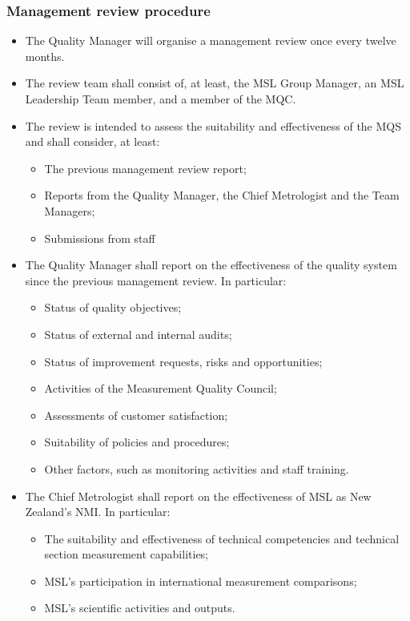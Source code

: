 \subsubsection{Management review procedure}
\begin{itemize}
\item The Quality Manager will organise a management review once every twelve months. 
\item The review team shall consist of, at least, the MSL Group Manager, an MSL Leadership Team member, and a member of the MQC.
\item The review is intended to assess the suitability and effectiveness of the MQS and shall consider, at least:
\begin{itemize}
\item The previous management review report;
\item Reports from the Quality Manager, the Chief Metrologist and the Team Managers; 
\item Submissions from staff
\end{itemize}
\item The Quality Manager shall report on the effectiveness of the quality system since the previous management review. In particular:
\begin{itemize}
\item Status of quality objectives;
\item Status of external and internal audits;
\item Status of improvement requests, risks and opportunities;
\item Activities of the Measurement Quality Council;
\item Assessments of customer satisfaction;
\item Suitability of policies and procedures;
\item Other factors, such as monitoring activities and staff training.
\end{itemize}
\item The Chief Metrologist shall report on the effectiveness of MSL as New Zealand’s NMI. In particular:
\begin{itemize}
\item The suitability and effectiveness of technical competencies and technical section measurement capabilities;
\item MSL’s participation in international measurement comparisons;
\item MSL’s scientific activities and outputs.
\end{itemize}

\end{itemize}
